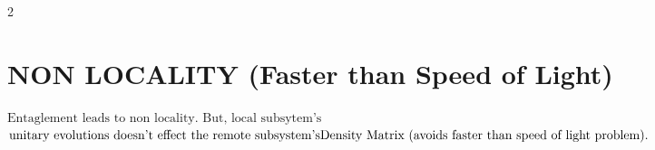 \documentclass[10pt,a4paper]{article}
\begin{document}
\begin{multicols}{2}
\section{NON LOCALITY  (Faster than Speed of Light)}
$\text{Entaglement leads to non locality. But, local subsytem's}$\\ $\text{unitary evolutions doesn't effect the remote subsystem's} \\ \text{Density Matrix (avoids faster than speed of light problem).}$\\\\\\\\\\\

\noindent{}

\end{multicols}
\end{document}
